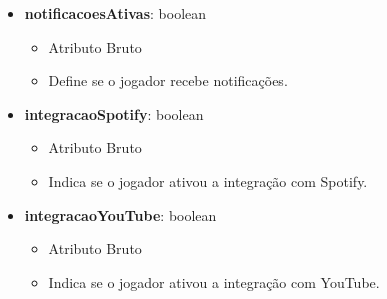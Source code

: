 \begin{itemize}
        \item \textbf{notificacoesAtivas}: boolean  
              \begin{itemize}
                  \item Atributo Bruto
                  \item Define se o jogador recebe notificações.
              \end{itemize}
    
        \item \textbf{integracaoSpotify}: boolean  
              \begin{itemize}
                  \item Atributo Bruto
                  \item Indica se o jogador ativou a integração com Spotify.
              \end{itemize}
    
        \item \textbf{integracaoYouTube}: boolean  
              \begin{itemize}
                  \item Atributo Bruto
                  \item Indica se o jogador ativou a integração com YouTube.
              \end{itemize}
    \end{itemize}

